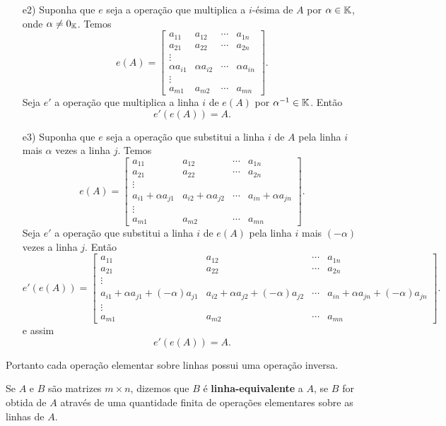 \begin{prova}
\begin{enumerate}
	\item [e2)] Suponha que $e$ seja a opera\c{c}\~ao que multiplica a $i$-\'esima de $A$ por $\alpha \in \mathbb{K}$, onde $\alpha \ne 0_{\mathbb{K}}$. Temos
	\[
	e(A) = 
	\begin{bmatrix}
	a_{11} & a_{12} & \cdots & a_{1n}\\
	a_{21} & a_{22} & \cdots & a_{2n}\\
	\vdots\\
	\alpha a_{i1} & \alpha a_{i2} & \cdots & \alpha a_{in}\\
	\vdots\\
	a_{m1} & a_{m2} & \cdots & a_{mn}
	\end{bmatrix}.
	\]
	Seja $e'$ a opera\c{c}\~ao que multiplica a linha $i$ de $e(A)$ por $\alpha^{-1} \in \mathbb{K}$. Ent\~ao
	\[
	e'(e(A)) = A.
	\]
	\item [e3)] Suponha que $e$ seja a opera\c{c}\~ao que substitui a linha $i$ de $A$ pela linha $i$ mais $\alpha$ vezes a linha $j$. Temos
	\[
	e(A) = 
	\begin{bmatrix}
	a_{11} & a_{12} & \cdots & a_{1n}\\
	a_{21} & a_{22} & \cdots & a_{2n}\\
	\vdots\\
	a_{i1} + \alpha a_{j1} & a_{i2} + \alpha a_{j2} & \cdots & a_{in} + \alpha a_{jn}\\
	\vdots\\
	a_{m1} & a_{m2} & \cdots & a_{mn}
	\end{bmatrix}.
	\]
	Seja $e'$ a opera\c{c}\~ao que substitui a linha $i$ de $e(A)$ pela linha $i$ mais $(-\alpha)$ vezes a linha $j$. Ent\~ao
	\[
	e'(e(A)) = 
	\begin{bmatrix}
	a_{11} & a_{12} & \cdots & a_{1n}\\
	a_{21} & a_{22} & \cdots & a_{2n}\\
	\vdots\\
	a_{i1} + \alpha a_{j1} + (-\alpha)a_{j1} & a_{i2} + \alpha a_{j2} + (-\alpha)a_{j2} & \cdots & a_{in} + \alpha a_{jn} + (-\alpha)a_{jn}\\
	\vdots\\
	a_{m1} & a_{m2} & \cdots & a_{mn}
	\end{bmatrix}.
	\]
	e assim
	\[
	e'(e(A)) = A.
	\]
\end{enumerate}
Portanto cada opera\c{c}\~ao elementar sobre linhas possui uma opera\c{c}\~ao inversa.
\end{prova}

\begin{definicao}
Se $A$ e $B$ s\~ao matrizes $m \times n$, dizemos que $B$ \'e \textbf{linha-equivalente} a $A$, se $B$ for obtida de $A$ atrav\'es de uma quantidade finita de opera\c{c}\~oes elementares sobre as linhas de $A$.
\end{definicao}

